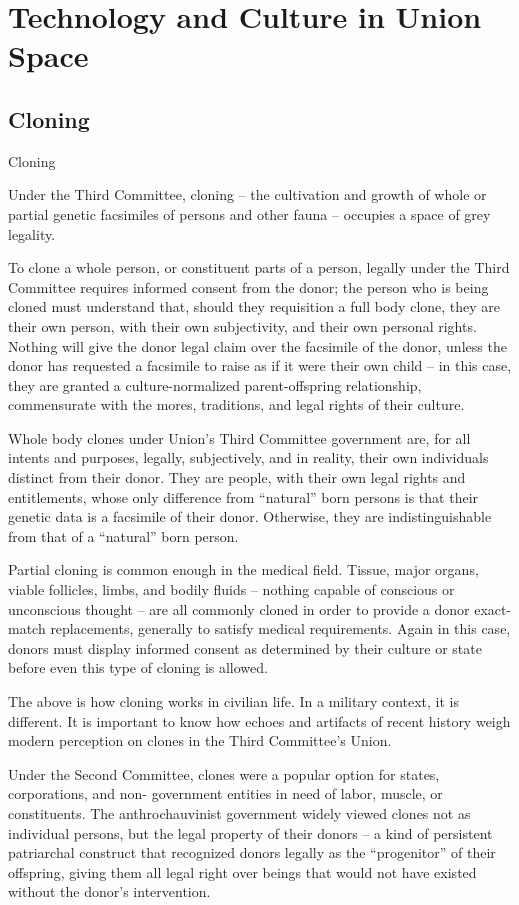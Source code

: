 \section{Technology and Culture in Union Space}

\subsection{Cloning}
Cloning

Under the Third Committee, cloning -- the cultivation and growth of whole or partial genetic
facsimiles of persons and other fauna -- occupies a space of grey legality.


To clone a whole person, or constituent parts of a person, legally under the Third Committee
requires informed consent from the donor; the person who is being cloned must understand that,
should they requisition a full body clone, they are their own person, with their own subjectivity,
and their own personal rights. Nothing will give the donor legal claim over the facsimile of the
donor, unless the donor has requested a facsimile to raise as if it were their own child -- in this
case, they are granted a culture-normalized parent-offspring relationship, commensurate with the
mores, traditions, and legal rights of their culture.


Whole body clones under Union’s Third Committee government are, for all intents and purposes,
legally, subjectively, and in reality, their own individuals distinct from their donor. They are people,
with their own legal rights and entitlements, whose only difference from “natural” born persons is
that their genetic data is a facsimile of their donor. Otherwise, they are indistinguishable from that
of a “natural” born person.


Partial cloning is common enough in the medical field. Tissue, major organs, viable follicles,
limbs, and bodily fluids -- nothing capable of conscious or unconscious thought -- are all
commonly cloned in order to provide a donor exact-match replacements, generally to satisfy
medical requirements. Again in this case, donors must display informed consent as determined
by their culture or state before even this type of cloning is allowed.


The above is how cloning works in civilian life. In a military context, it is different. It is important
to know how echoes and artifacts of recent history weigh modern perception on clones in the
Third Committee’s Union.


Under the Second Committee, clones were a popular option for states, corporations, and non-
government entities in need of labor, muscle, or constituents. The anthrochauvinist government
widely viewed clones not as individual persons, but the legal property of their donors -- a kind of
persistent patriarchal construct that recognized donors legally as the “progenitor” of their
offspring, giving them all legal right over beings that would not have existed without the donor’s
intervention.


